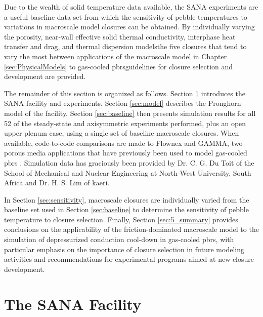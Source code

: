 Due to the wealth of solid temperature data available, the SANA experiments are a useful baseline data set from which the sensitivity of pebble temperatures to variations in macroscale model closures can be obtained. By individually varying the porosity, near-wall effective solid thermal conductivity, interphase heat transfer and drag, and thermal dispersion models\mdash the five closures that tend to vary the most between applications of the macroscale model in Chapter \ref{sec:PhysicalModels} to gas-cooled \glspl{pbr}\mdash guidelines for closure selection and development are provided.

The remainder of this section is organized as follows. Section \ref{sec:experimental} introduces the SANA facility and experiments. Section \ref{sec:model} describes the Pronghorn model of the facility. Section \ref{sec:baseline} then presents simulation results for all 52 of the steady-state and axisymmetric experiments performed, plus an open upper plenum case, using a single set of baseline macroscale closures. When available, code-to-code comparisons are made to Flownex and GAMMA, two porous media applications that have previously been used to model gas-cooled \glspl{pbr} \cite{duToit2006,lim}. Simulation data has graciously been provided by Dr. C. G. Du Toit of the School of Mechanical and Nuclear Engineering at North-West University, South Africa and Dr. H. S. Lim of \gls{kaeri}.

In Section \ref{sec:sensitivity}, macroscale closures are individually varied from the baseline set used in Section \ref{sec:baseline} to determine the sensitivity of pebble temperature to closure selection. Finally, Section \ref{sec:5_summary} provides conclusions on the applicability of the friction-dominated macroscale model to the simulation of depressurized conduction cool-down in gas-cooled \glspl{pbr}, with particular emphasis on the importance of closure selection in future modeling activities and recommendations for experimental programs aimed at new closure development.

\section{The SANA Facility}
\label{sec:experimental}

